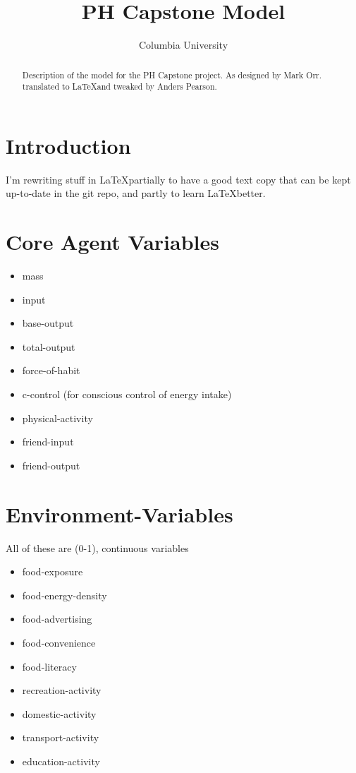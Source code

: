 \documentclass[12pt]{article}
\title{PH Capstone Model}
\author{Columbia University}
\begin{document}
\maketitle

\begin{abstract}
Description of the model for the PH Capstone project. As designed by Mark Orr. translated to \LaTeX and tweaked by Anders Pearson.
\end{abstract}

\section{Introduction}

I'm rewriting stuff in \LaTeX partially to have a good text copy that can be kept up-to-date in the git repo, and partly to learn \LaTeX better.


\section{Core Agent Variables}

\begin{itemize}
\item mass
\item input
\item base-output
\item total-output
\item force-of-habit
\item c-control (for conscious control of energy intake)
\item physical-activity
\item friend-input
\item friend-output
\end{itemize}


\section{Environment-Variables}

All of these are (0-1), continuous variables

\begin{itemize}
\item food-exposure
\item food-energy-density
\item food-advertising
\item food-convenience
\item food-literacy
\item recreation-activity
\item domestic-activity
\item transport-activity
\item education-activity
\end{itemize}
\end{document}
